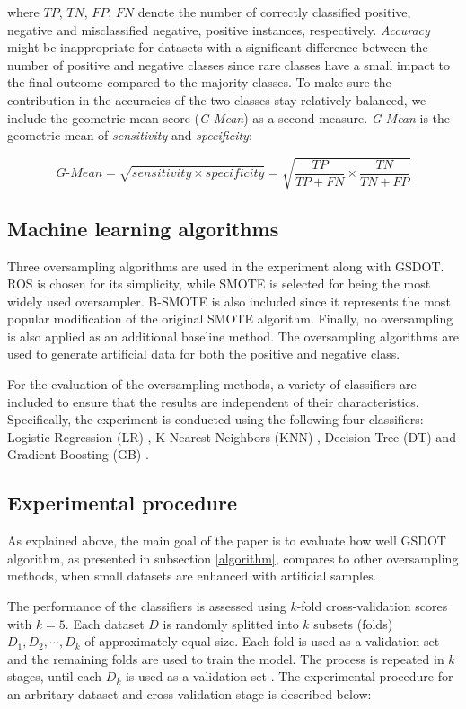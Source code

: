 where \( TP \), \( TN \), \(FP \), \( FN\) denote the number of correctly classified positive, negative and misclassified negative, positive instances, respectively. \textit{Accuracy} might be inappropriate for datasets with a significant difference between the number of positive and negative classes since rare classes have a small impact to the final outcome compared to the majority classes. To make sure the contribution in the accuracies of the two classes stay relatively balanced, we include the geometric mean score (\textit{G-Mean}) as a second measure. \textit{G-Mean} is the geometric mean of \textit{sensitivity} and \textit{specificity}:

$$\textit{G-Mean} = \sqrt{sensitivity \times specificity} = \sqrt{\frac{TP}{TP + FN} \times \frac{TN}{TN + FP}}$$

\subsection{Machine learning algorithms}

Three oversampling algorithms are used in the experiment along with GSDOT. ROS is chosen for its simplicity, while SMOTE is selected for being the most widely used oversampler. B-SMOTE is also included since it represents the most popular modification of the original SMOTE algorithm. Finally, no oversampling is also applied as an additional baseline method. The oversampling algorithms are used to generate artificial data for both the positive and negative class.

For the evaluation of the oversampling methods, a variety of classifiers are included to ensure that the results are independent of their characteristics. Specifically, the experiment is conducted using the following four classifiers: Logistic Regression (LR) \cite{McCullagh.2019}, K-Nearest Neighbors (KNN) \cite{Cover.1967}, Decision Tree (DT) \cite{Salzberg.1994} and Gradient Boosting (GB) \cite{Friedman.2001}.

\subsection{Experimental procedure}
\label{experimental}

As explained above, the main goal of the paper is to evaluate how well GSDOT algorithm, as presented in subsection \ref{algorithm}, compares to other oversampling methods, when small datasets are enhanced with artificial samples. 

The performance of the classifiers is assessed using \(k \)-fold cross-validation scores with \( k = 5 \). Each dataset \( D \) is randomly splitted into \( k \) subsets (folds) \( D_1, D_2, \cdots, D_k \) of approximately equal size. Each fold is used as a validation set and the remaining folds are used to train the model. The process is repeated in \( k \) stages, until each \( D_k \) is used as a validation set \cite{Han.2012}. The experimental procedure for an arbritary dataset and cross-validation stage is described below:

